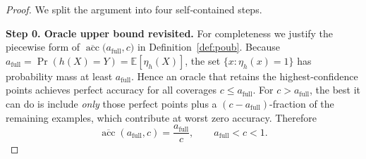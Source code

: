 \begin{proof}
We split the argument into four self‑contained steps.

\textbf{Step 0.  Oracle upper bound revisited.}
For completeness we justify the piecewise form of
\(\overline{\operatorname{acc}}\bigl(a_{\mathrm{full}},c\bigr)\)
in Definition~\ref{def:poub}.
Because
\(a_{\mathrm{full}}=\Pr(h(X)=Y)=\mathbb E[\eta_h(X)]\),
the set
\(\{x:\eta_h(x)=1\}\) has probability mass at least
\(a_{\mathrm{full}}\).  Hence an oracle that retains the
highest‑confidence points achieves perfect accuracy for all
coverages \(c\le a_{\mathrm{full}}\).  For \(c>a_{\mathrm{full}}\),
the best it can do is include \emph{only} those perfect points
plus a \((c-a_{\mathrm{full}})\)-fraction of the remaining
examples, which contribute at worst zero accuracy.  Therefore
\begin{equation}
\overline{\operatorname{acc}}(a_{\mathrm{full}},c)=
\frac{a_{\mathrm{full}}}{c},
\qquad
a_{\mathrm{full}}<c<1.
\end{equation}


\end{proof}
